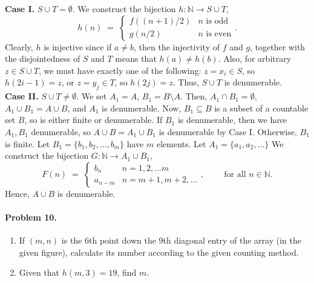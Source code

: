 \documentclass[10pt]{article}
\begin{document}
        \textbf{Case I.} $S \cup T = \emptyset$. We construct the bijection $h\colon \mathbb{N} \to S\cup T$,
        \[
                h(n) \;=\; \begin{cases}
                        f((n + 1)/2)    &       n\text{ is odd}\\
                        g(n / 2)        &       n\text{ is even}
                \end{cases}.
        \]
        Clearly, $h$ is injective since if $a \neq b$, then the injectivity of $f$ and $g$, together with the disjointedness of $S$ and $T$
        means that $h(a) \neq h(b)$. Also, for arbitrary $z \in S \cup T$, we must have exactly one of the following: $z = x_i\in S$, so $h(2i - 1) = z$,
        or $z = y_j \in T$, so $h(2j) = z$. Thus, $S\cup T$ is denumerable.\\
        \textbf{Case II.} $S \cup T \neq \emptyset$. We set $A_1 = A$, $B_1 = B\setminus A$. Then, $A_1 \cap B_1 = \emptyset$, $A_1 \cup B_1 = A \cup B$,
        and $A_1$ is denumerable. Now, $B_1 \subseteq B$ is a subset of a countable set $B$, so is either finite or denumerable.
        If $B_1$ is denumerable, then we have $A_1, B_1$ denumerable, so $A \cup B = A_1 \cup B_1$ is denumerable by Case I.
        Otherwise, $B_1$ is finite. Let $B_1 = \{b_1, b_2, \dots, b_m\}$ have $m$ elements.
        Let $A_1 = \{a_1, a_2, \dots\}$
        We construct the bijection $G\colon \mathbb{N} \to A_1\cup B_1$,
        \[
                F(n) \;=\; \begin{cases}
                        b_n             &       n = 1, 2, \dots m \\
                        a_{n - m}       &       n = m + 1, m + 2, \dots
                \end{cases}, \quad\quad\text{ for all }n \in \mathbb{N}.
        \]
        Hence, $A \cup B$ is denumerable.

        \paragraph{Problem 10.}
        \begin{enumerate}
                \item If $(m, n)$ is the 6th point down the 9th diagonal entry of the array (in the given figure), calculate
        its number according to the given counting method.
                \item Given that $h(m, 3) = 19$, find $m$.
        \end{enumerate}
\end{document}
